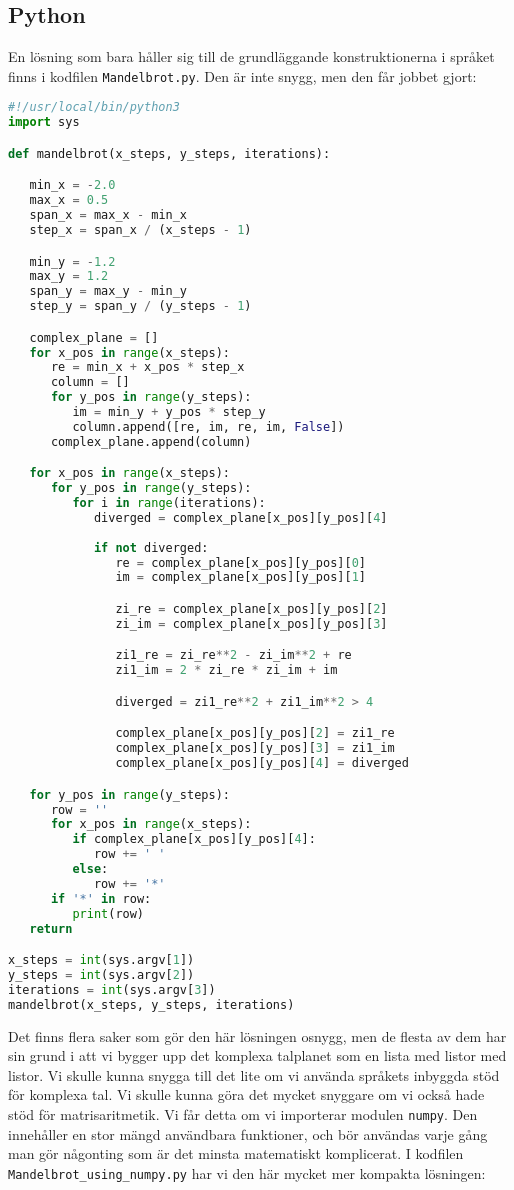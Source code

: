 \documentclass[10pt, twoside,a4paper]{article}
\begin{document}
\subsection{Python}
En lösning som bara håller sig till de grundläggande konstruktionerna i språket finns i kodfilen \verb+Mandelbrot.py+. Den är inte snygg, men den får jobbet gjort:
\begin{lstlisting}[language=python]
#!/usr/local/bin/python3
import sys

def mandelbrot(x_steps, y_steps, iterations):

   min_x = -2.0
   max_x = 0.5
   span_x = max_x - min_x
   step_x = span_x / (x_steps - 1)

   min_y = -1.2
   max_y = 1.2
   span_y = max_y - min_y
   step_y = span_y / (y_steps - 1)

   complex_plane = []
   for x_pos in range(x_steps):
      re = min_x + x_pos * step_x
      column = []
      for y_pos in range(y_steps):
         im = min_y + y_pos * step_y
         column.append([re, im, re, im, False])
      complex_plane.append(column)

   for x_pos in range(x_steps):
      for y_pos in range(y_steps):
         for i in range(iterations):
            diverged = complex_plane[x_pos][y_pos][4]
            
            if not diverged:
               re = complex_plane[x_pos][y_pos][0]
               im = complex_plane[x_pos][y_pos][1]

               zi_re = complex_plane[x_pos][y_pos][2]
               zi_im = complex_plane[x_pos][y_pos][3]

               zi1_re = zi_re**2 - zi_im**2 + re
               zi1_im = 2 * zi_re * zi_im + im

               diverged = zi1_re**2 + zi1_im**2 > 4

               complex_plane[x_pos][y_pos][2] = zi1_re
               complex_plane[x_pos][y_pos][3] = zi1_im
               complex_plane[x_pos][y_pos][4] = diverged

   for y_pos in range(y_steps):
      row = ''
      for x_pos in range(x_steps):
         if complex_plane[x_pos][y_pos][4]:
            row += ' '
         else:
            row += '*'
      if '*' in row:
         print(row)
   return

x_steps = int(sys.argv[1])
y_steps = int(sys.argv[2])
iterations = int(sys.argv[3])
mandelbrot(x_steps, y_steps, iterations)
\end{lstlisting}
Det finns flera saker som gör den här lösningen osnygg, men de flesta av dem har sin grund i att vi bygger upp det komplexa talplanet som en lista med listor med listor. Vi skulle kunna snygga till det lite om vi använda språkets inbyggda stöd för komplexa tal. Vi skulle kunna göra det mycket snyggare om vi också hade stöd för matrisaritmetik. Vi får detta om vi importerar modulen \verb+numpy+. Den innehåller en stor mängd användbara funktioner, och bör användas varje gång man gör någonting som är det minsta matematiskt komplicerat. I kodfilen \verb+Mandelbrot_using_numpy.py+ har vi den här mycket mer kompakta lösningen:
\end{document}
